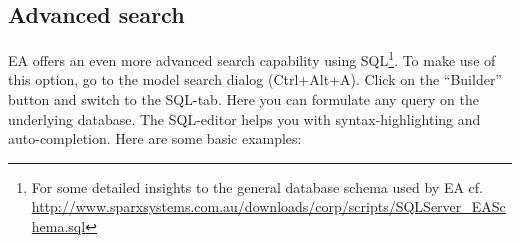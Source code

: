 \subsection{Advanced search}
\label{sect:appendix_adv_search}

EA offers an even more advanced search capability using SQL\footnote{For some detailed insights to the general database schema used by EA cf. \\
\url{http://www.sparxsystems.com.au/downloads/corp/scripts/SQLServer_EASchema.sql}}.
To make use of this option, go to the model search dialog (\mbox{Ctrl+Alt+A}). Click on the ``Builder'' button and switch to the SQL-tab. Here you can 
formulate any query on the underlying database. The SQL-editor helps you with syntax-highlighting and auto-completion. Here are some basic examples:

